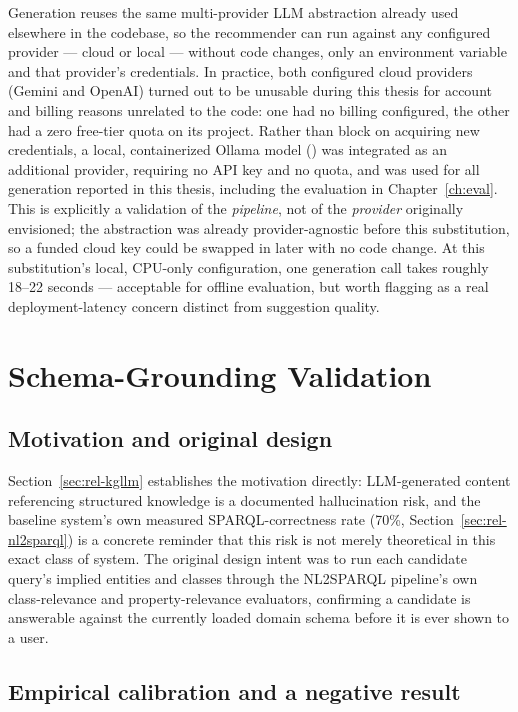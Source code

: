 Generation reuses the same multi-provider LLM abstraction already used elsewhere in the codebase,
so the recommender can run against any configured provider --- cloud or local --- without code
changes, only an environment variable and that provider's credentials. In practice, both configured
cloud providers (Gemini and OpenAI) turned out to be unusable during this thesis for account and
billing reasons unrelated to the code: one had no billing configured, the other had a zero free-tier
quota on its project. Rather than block on acquiring new credentials, a local, containerized Ollama
model () was integrated as an additional provider, requiring no API key and no
quota, and was used for all generation reported in this thesis, including the evaluation in
Chapter~\ref{ch:eval}. This is explicitly a validation of the \emph{pipeline}, not of the
\emph{provider} originally envisioned; the abstraction was already provider-agnostic before this
substitution, so a funded cloud key could be swapped in later with no code change. At this
substitution's local, CPU-only configuration, one generation call takes roughly 18--22 seconds ---
acceptable for offline evaluation, but worth flagging as a real deployment-latency concern distinct
from suggestion quality.

\section{Schema-Grounding Validation}
\label{sec:rec-validation}

\subsection{Motivation and original design}

Section~\ref{sec:rel-kgllm} establishes the motivation directly: LLM-generated content referencing
structured knowledge is a documented hallucination risk, and the baseline system's own measured
SPARQL-correctness rate (70\%, Section~\ref{sec:rel-nl2sparql}) is a concrete reminder that this
risk is not merely theoretical in this exact class of system. The original design intent was to run
each candidate query's implied entities and classes through the NL2SPARQL pipeline's own
class-relevance and property-relevance evaluators, confirming a candidate is answerable against the
currently loaded domain schema before it is ever shown to a user.

\subsection{Empirical calibration and a negative result}

